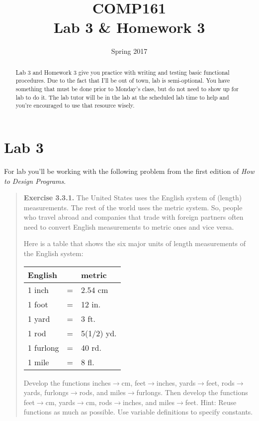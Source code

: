 \documentclass[]{tufte-handout}
\title{COMP161 \\ Lab 3 \& Homework 3}
\author{}
\date{Spring 2017}
\begin{document}
\maketitle

\begin{abstract}
Lab 3 and Homework 3 give you practice with writing and testing basic functional procedures. Due to the fact that I'll be out of town, lab is semi-optional. You have something that must be done prior to Monday's class, but do not need to show up for lab to do it. The lab tutor will be in the lab at the scheduled lab time to help and you're encouraged to use that resource wisely.
\end{abstract}

\section{Lab 3}

For lab you'll be working with the following problem from the first edition of \textit{How to Design Programs}.
\begin{framed}
\begin{quote}
\textbf{Exercise 3.3.1.}   The United States uses the English system of (length) measurements. The rest of the world uses the metric system. So, people who travel abroad and companies that trade with foreign partners often need to convert English measurements to metric ones and vice versa.

Here is a table that shows the six major units of length measurements of the English system:


\begin{center}
\begin{tabular}{lcl}
English & &  metric \\ \toprule
1 inch	&=&	2.54	cm \\
1 foot	&=&	12	in. \\
1 yard	&=&	3	ft. \\
1 rod	&=&	5(1/2)	yd.\\
1 furlong	&=&	40	rd.\\
1 mile	&=&	8	fl.
\end{tabular}
\end{center}

Develop the functions inches$\rightarrow$cm, feet$\rightarrow$inches, yards$\rightarrow$feet, rods$\rightarrow$yards, furlongs$\rightarrow$rods, and miles$\rightarrow$furlongs.
Then develop the functions feet$\rightarrow$cm, yards$\rightarrow$cm, rods$\rightarrow$inches, and miles$\rightarrow$feet.
Hint: Reuse functions as much as possible. Use variable definitions to specify constants.
\end{quote}
\end{framed}
\end{document}
